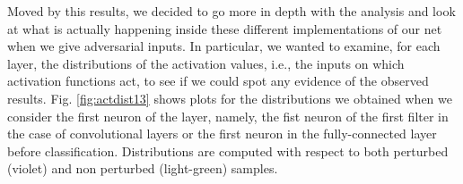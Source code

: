 \documentclass[LaM,binding=0.6cm]{./packages/sapthesis/sapthesis}
\begin{document}
        Moved by this results, we decided to go more in depth with the analysis and look at what is actually happening inside these different implementations of our 
        net when we give adversarial inputs. In particular, we wanted to examine, for each layer, the distributions of the activation values, i.e., the inputs on which activation
        functions act, to see if we could spot any evidence of the observed results. Fig. \ref{fig:actdist13} shows plots for the distributions we obtained when we 
        consider the first neuron of the layer, namely, the fist neuron of the first filter in the case of convolutional layers or the first neuron in the 
        fully-connected layer before classification. Distributions are computed with respect to both perturbed (violet) and non perturbed (light-green) samples. 
\end{document}
